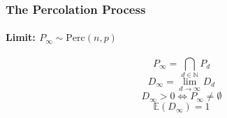 \documentclass{beamer}
\newcommand{\perc}[2]{\text{Perc}\left( #1, #2 \right)}
\newcommand{\N}{\mathbb{N}}
\newcommand{\E}{\mathbb{E}}
\begin{document}
\begin{frame}
{\begin{center}
			\end{center}
		}
	\end{frame}
	\begin{frame}
		\frametitle{The Percolation Process}
		\framesubtitle{Limit: $P_{\infty} \sim \perc{n}{p}$}		
		$$P_{\infty} = \bigcap_{d \in \N} P_d$$
		$$D_{\infty} = \lim_{d \to \infty} D_d$$
		\vspace*{1cm}
		\pause
		$$D_{\infty}>0 \iff P_{\infty} \neq \emptyset$$
		$$\E(D_{\infty}) = 1$$
	\end{frame}
\end{document}
